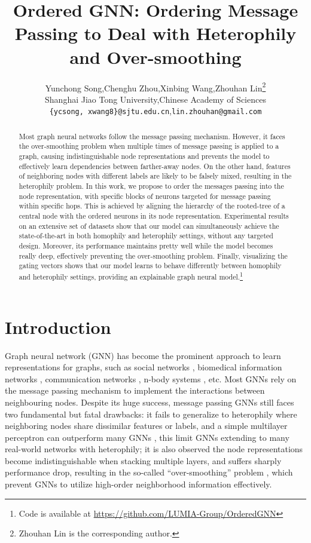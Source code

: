\documentclass{article}
\title{Ordered GNN: Ordering Message Passing to Deal with Heterophily and Over-smoothing}
\author{Yunchong Song,\quad Chenghu Zhou,\quad Xinbing Wang,\quad Zhouhan Lin\thanks{Zhouhan Lin is the corresponding author.}\\
Shanghai Jiao Tong University,\quad Chinese Academy of Sciences\\
\texttt{\{ycsong, xwang8\}@sjtu.edu.cn},\quad \texttt{lin.zhouhan@gmail.com}\\
}
\begin{document}
\maketitle

\begin{abstract}
Most graph neural networks follow the message passing mechanism. However, it faces the over-smoothing problem when multiple times of message passing is applied to a graph, causing indistinguishable node representations and prevents the model to effectively learn dependencies between farther-away nodes. On the other hand, features of neighboring nodes with different labels are likely to be falsely mixed, resulting in the heterophily problem.
In this work, we propose to order the messages passing into the node representation, with specific blocks of neurons targeted for message passing within specific hops. This is achieved by aligning the hierarchy of the rooted-tree of a central node with the ordered neurons in its node representation.
Experimental results on an extensive set of datasets show that our model can simultaneously achieve the state-of-the-art in both homophily and heterophily settings, without any targeted design. Moreover, its performance maintains pretty well while the model becomes really deep, effectively preventing the over-smoothing problem. Finally, visualizing the gating vectors shows that our model learns to behave differently between homophily and heterophily settings, providing an explainable graph neural model.\footnote{Code is available at \url{https://github.com/LUMIA-Group/OrderedGNN}}

\end{abstract}

\section{Introduction}

Graph neural network (GNN) \citep{scarselli2008graph,bruna2013spectral,defferrard2016convolutional,kipf2016semi,velivckovic2017graph,hamilton2017inductive,gilmer2017neural,xu2018powerful} has become the prominent approach to learn representations for graphs, such as social networks \citep{li2019encoding}, biomedical information networks \citep{yan2019groupinn}, communication networks \citep{suarez2021graph}, n-body systems \citep{kipf2018neural}, etc. Most GNNs rely on the message passing mechanism \citep{gilmer2017neural} to implement the interactions between neighbouring nodes. Despite its huge success, message passing GNNs still faces two fundamental but fatal drawbacks: it fails to generalize to heterophily where neighboring nodes share dissimilar features or labels, and a simple multilayer perceptron can outperform many GNNs \citep{zhu2020beyond}, this limit GNNs extending to many real-world networks with heterophily;
it is also observed the node representations become indistinguishable when stacking multiple layers, and suffers sharply performance drop, resulting in the so-called ``over-smoothing'' problem \citep{li2018deeper}, which prevent GNNs to utilize high-order neighborhood information effectively.
\end{document}
